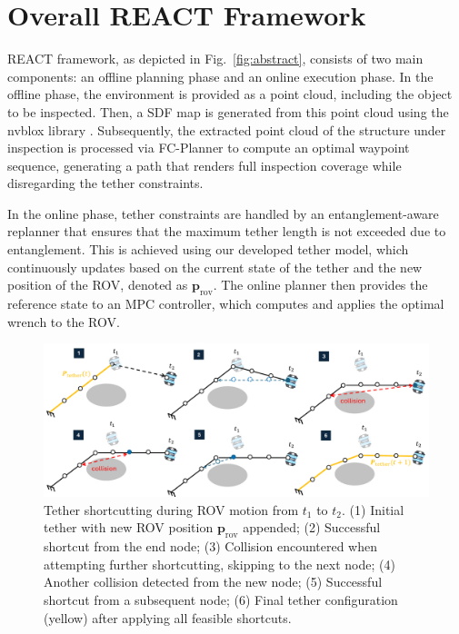 \section{Overall \ac{REACT}  Framework}
\label{sec:framework}
\ac{REACT} framework, as depicted in Fig.~\ref{fig:abstract}, consists of two main components: an offline planning phase and an online execution phase. In the offline phase, the environment is provided as a point cloud, including the object to be inspected. Then, a \ac{SDF} map is generated from this point cloud using the nvblox library \cite{nvblox}. Subsequently, the extracted point cloud of the structure under inspection is processed via FC-Planner \cite{feng2024fc} to compute an optimal waypoint sequence, generating a path that renders full inspection coverage while disregarding the tether constraints.

In the online phase, tether constraints are handled by an entanglement-aware replanner that ensures that the maximum tether length is not exceeded due to entanglement. This is achieved using our developed tether model, which continuously updates based on the current state of the tether and the new position of the \ac{ROV}, denoted as $\textbf{p}_{\mathrm{rov}}$. The online planner then provides the reference state to an \ac{MPC} controller, which computes and applies the optimal wrench to the \ac{ROV}.




\begin{figure}[t!]
    \centering
    \includegraphics[width=1\linewidth]{EA-Planner/figures/tether_model.pdf}
    \caption{Tether shortcutting during \ac{ROV} motion from \( t_1 \) to \( t_2 \). (1) Initial tether with new \ac{ROV} position \( \mathbf{p}_{\text{rov}} \) appended; (2) Successful shortcut from the end node; (3) Collision encountered when attempting further shortcutting, skipping to the next node; (4) Another collision detected from the new node; (5) Successful shortcut from a subsequent node; (6) Final tether configuration (yellow) after applying all feasible shortcuts.}
    \label{fig:tether}
\end{figure}



